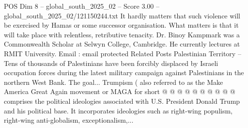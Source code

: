 \begin{textsample}{POS Dim 8 – global\_south\_2025\_02 – Score 3.00 – global\_south\_2025\_02/121150244.txt}
It hardly matters that such violence will be exercised by Hamas or some successor organisation.
What matters is that it will take place with relentless, retributive tenacity.
Dr.
Binoy Kampmark was a Commonwealth Scholar at Selwyn College, Cambridge.
He currently lectures at RMIT University.
Email : email protected Related Posts Palestinian Territory -- Tens of thousands of Palestinians have been forcibly displaced by Israeli occupation forces during the latest military campaign against Palestinians in the northern West Bank.
The goal...
Trumpism ( also referred to as the Make America Great Again movement or MAGA for short @ @ @ @ @ @ @ @ @ @ comprises the political ideologies associated with U.S.
President Donald Trump and his political base.
It incorporates ideologies such as right-wing populism, right-wing anti-globalism, exceptionalism,...

\end{textsample}
